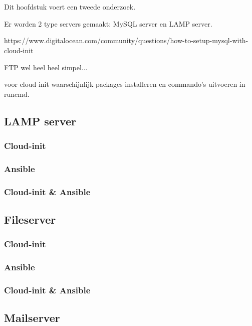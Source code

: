 \chapter{}
\label{ch:serverconf}
Dit hoofdstuk voert een tweede onderzoek.

Er worden 2 type servers gemaakt: MySQL server en LAMP server.

https://www.digitalocean.com/community/questions/how-to-setup-mysql-with-cloud-init


FTP wel heel heel simpel...

voor cloud-init waarschijnlijk packages installeren en commando's uitvoeren in runcmd.
\section{LAMP server}

\subsection{Cloud-init}

\subsection{Ansible}

\subsection{Cloud-init \& Ansible}

\section{Fileserver}

\subsection{Cloud-init}

\subsection{Ansible}

\subsection{Cloud-init \& Ansible}

\section{Mailserver}

